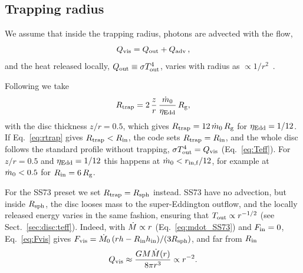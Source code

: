\subsection{Trapping radius}
\label{sec:radii:trap}

We assume that inside the trapping radius, photons are advected with the flow,
\begin{equation}
    Q_{\rm vis } =  Q_{\rm out }  + Q_{\rm adv } \, ,
\end{equation}
and the heat released locally, $Q_{\rm out}  \equiv \sigma T_{\rm out}^4 $, varies with radius as $\propto 1/r^2$~\citep[e.g.,][]{Abramowicz1988}.

Following \citet{Middleton2026} we take
\begin{equation}
R_{\rm trap} = 2\,\frac{z}{r}\,\frac{\dot m_0}{\eta_{\rm Edd}}\,R_{\rm g} ,
\label{eq:rtrap}
\end{equation}
with the disc thickness $z/r = 0.5$, which gives $R_{\rm trap} = 12\,\dot m_0\,R_{\rm g}$ for $\eta_{\rm Edd} = 1/12$. If Eq.~\eqref{eq:rtrap} gives $R_{\rm trap} < R_{\rm in}$, the code sets $R_{\rm trap} = R_{\rm in}$, and the whole disc follows the standard profile without trapping, $\sigma T_{\rm out}^4 = Q_{\rm vis}$ (Eq.~\ref{eq:Teff}).
For $z/r = 0.5$ and $\eta_{\rm Edd} = 1/12$ this happens at $\dot m_0 < r_{\rm in,f}/12$, for example at $\dot m_0 < 0.5$ for $R_{\rm in} = 6\,R_{\rm g}$.


For the SS73 preset we set $R_{\rm trap} = R_{\rm sph}$ instead.
SS73 have no advection, but inside $R_{\rm sph}$, the disc looses mass to the super-Eddington outflow, and the locally released energy varies in the same fashion, ensuring that $T_{\rm out} \propto r^{-1/2}$ (see Sect.~\ref{sec:disc:teff}).
Indeed, with $\dot M \propto r$ (Eq.~\ref{eq:mdot_SS73}) and $F_{\rm in} = 0$, Eq.~\eqref{eq:Fvis} gives $F_{\rm vis} = \dot M_0\,(rh - R_{\rm in} h_{\rm in})/(3R_{\rm sph})$, and far from $R_{\rm in}$
\begin{equation}
Q_{\rm vis} \approx \frac{GM\dot M(r)}{8\pi r^3} \propto r^{-2} .
\label{eq:Qvis_SS73}
\end{equation}
